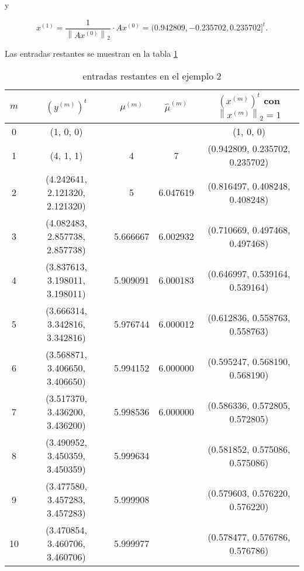 \documentclass[12pt, a4paper]{article}
\numberwithin{subsection}{section} %
\begin{document}
            y
        
            $$x^{(1)} = \frac{1}{\left\|Ax^{(0)}\right\|_2}· Ax^{(0)} = (0.942809,-0.235702, 0.235702]^t.$$
        
            Las entradas restantes se muestran en la tabla \ref{tab:ej22}
        
            \begin{table}[h!]
                \centering
                \caption{entradas restantes en el ejemplo 2}
                \label{tab:ej22}
                \begin{tabular}{|ccccc|} \hline
                    $m$ & $(y^{(m)})^t$ & $\mu^{(m)}$ & $\hat{\mu}^{(m)}$ & $(x^{(m)})^t$ con $\left\|x^{(m)}\right\|_{2} = 1$ \\ \hline
                    0  &  (1, 0, 0) & & & (1, 0, 0)  \\
                    1  &  (4, 1, 1)                       &  4         & 7          &(0.942809, 0.235702, 0.235702) \\
                    2  &  (4.242641, 2.121320, 2.121320)  &  5         &  6.047619  &(0.816497, 0.408248, 0.408248) \\
                    3  &  (4.082483, 2.857738, 2.857738)  &  5.666667  &  6.002932  &(0.710669, 0.497468, 0.497468) \\
                    4  &  (3.837613, 3.198011, 3.198011)  &  5.909091  &  6.000183  &(0.646997, 0.539164, 0.539164) \\
                    5  &  (3.666314, 3.342816, 3.342816)  &  5.976744  &  6.000012  &(0.612836, 0.558763, 0.558763) \\
                    6  &  (3.568871, 3.406650, 3.406650)  &  5.994152  &  6.000000  &(0.595247, 0.568190, 0.568190) \\
                    7  &  (3.517370, 3.436200, 3.436200)  &  5.998536  &  6.000000  &(0.586336, 0.572805, 0.572805) \\
                    8  &  (3.490952, 3.450359, 3.450359)  &  5.999634  &            &(0.581852, 0.575086, 0.575086) \\
                    9  &  (3.477580, 3.457283, 3.457283)  &  5.999908  &            &(0.579603, 0.576220, 0.576220) \\
                    10 &  (3.470854, 3.460706, 3.460706)  &  5.999977  &            &(0.578477, 0.576786, 0.576786) \\ \hline
                \end{tabular}
            \end{table}
        
\end{document}

